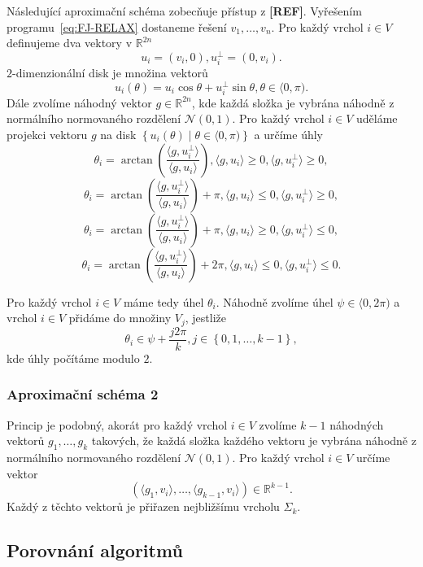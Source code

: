 Následující aproximační schéma zobecňuje přístup z \textbf{[REF]}. Vyřešením programu~\ref{eq:FJ-RELAX} dostaneme řešení $v_1, \dots, v_n$. Pro každý vrchol $i \in V$ definujeme dva vektory v $\mathbb{R}^{2n}$
$$
    u_i = \left( v_i, 0 \right), u_i^\bot = \left( 0, v_i \right).
$$
$2$-dimenzionální disk je množina vektorů
$$
    u_i(\theta) = u_i \cos \theta + u_i^\bot \sin \theta, \theta \in \langle 0, \pi).
$$
Dále zvolíme náhodný vektor $g \in \mathbb{R}^{2n}$, kde každá složka je vybrána náhodně z normálního normovaného rozdělení $\mathcal{N}(0,1)$. Pro každý vrchol $i \in V$ uděláme projekci vektoru $g$ na disk $\left\{ u_i(\theta) \mid \theta \in \langle 0, \pi ) \right\}$ a určíme úhly
$$
    \theta_i = \arctan \left( \frac{\langle g, u_i^\bot \rangle}{\langle g, u_i \rangle} \right), \langle g, u_i \rangle \geq 0, \langle g, u_i^\bot \rangle \geq 0,
$$
$$
    \theta_i = \arctan \left( \frac{\langle g, u_i^\bot \rangle}{\langle g, u_i \rangle} \right) + \pi, \langle g, u_i \rangle \leq 0, \langle g, u_i^\bot \rangle \geq 0,
$$
$$
    \theta_i = \arctan \left( \frac{\langle g, u_i^\bot \rangle}{\langle g, u_i \rangle} \right) + \pi, \langle g, u_i \rangle \geq 0, \langle g, u_i^\bot \rangle \leq 0,
$$
$$
    \theta_i = \arctan \left( \frac{\langle g, u_i^\bot \rangle}{\langle g, u_i \rangle} \right) + 2\pi, \langle g, u_i \rangle \leq 0, \langle g, u_i^\bot \rangle \leq 0.
$$

Pro každý vrchol $i \in V$ máme tedy úhel $\theta_i$. Náhodně zvolíme úhel $\psi \in \langle 0, 2 \pi )$ a vrchol $i \in V$ přidáme do množiny $V_j$, jestliže
$$
    \theta_i \in \psi + \frac{j 2 \pi}{k}, j \in \left\{ 0, 1, \dots, k-1 \right\},
$$
kde úhly počítáme modulo $2$.


\subsubsection*{Aproximační schéma 2}

Princip je podobný, akorát pro každý vrchol $i \in V$ zvolíme $k-1$ náhodných vektorů $g_1, \dots, g_k$ takových, že každá složka každého vektoru je vybrána náhodně z normálního normovaného rozdělení $\mathcal{N}(0,1)$. Pro každý vrchol $i \in V$ určíme vektor
$$
    \left( \langle g_1, v_i \rangle, \dots, \langle g_{k-1}, v_i \rangle \right) \in \mathbb{R}^{k-1}.
$$
Každý z těchto vektorů je přiřazen nejbližšímu vrcholu $\Sigma_k$.

\subsection{Porovnání algoritmů}

